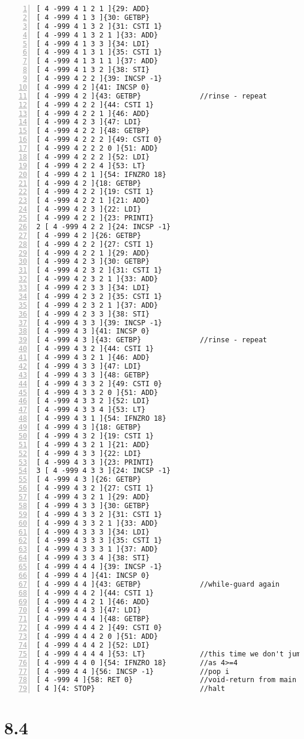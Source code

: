 \documentclass[a4paper, titlepage]{article}
\begin{document}
\begin{lstlisting}[numbers=left, title=ex.3.c.trace]
[ 4 -999 4 1 2 1 ]{29: ADD}
[ 4 -999 4 1 3 ]{30: GETBP}
[ 4 -999 4 1 3 2 ]{31: CSTI 1}
[ 4 -999 4 1 3 2 1 ]{33: ADD}
[ 4 -999 4 1 3 3 ]{34: LDI}
[ 4 -999 4 1 3 1 ]{35: CSTI 1}
[ 4 -999 4 1 3 1 1 ]{37: ADD}
[ 4 -999 4 1 3 2 ]{38: STI}
[ 4 -999 4 2 2 ]{39: INCSP -1}
[ 4 -999 4 2 ]{41: INCSP 0}
[ 4 -999 4 2 ]{43: GETBP}              //rinse - repeat
[ 4 -999 4 2 2 ]{44: CSTI 1}
[ 4 -999 4 2 2 1 ]{46: ADD}
[ 4 -999 4 2 3 ]{47: LDI}
[ 4 -999 4 2 2 ]{48: GETBP}
[ 4 -999 4 2 2 2 ]{49: CSTI 0}
[ 4 -999 4 2 2 2 0 ]{51: ADD}
[ 4 -999 4 2 2 2 ]{52: LDI}
[ 4 -999 4 2 2 4 ]{53: LT}
[ 4 -999 4 2 1 ]{54: IFNZRO 18}
[ 4 -999 4 2 ]{18: GETBP}
[ 4 -999 4 2 2 ]{19: CSTI 1}
[ 4 -999 4 2 2 1 ]{21: ADD}
[ 4 -999 4 2 3 ]{22: LDI}
[ 4 -999 4 2 2 ]{23: PRINTI}
2 [ 4 -999 4 2 2 ]{24: INCSP -1}
[ 4 -999 4 2 ]{26: GETBP}
[ 4 -999 4 2 2 ]{27: CSTI 1}
[ 4 -999 4 2 2 1 ]{29: ADD}
[ 4 -999 4 2 3 ]{30: GETBP}
[ 4 -999 4 2 3 2 ]{31: CSTI 1}
[ 4 -999 4 2 3 2 1 ]{33: ADD}
[ 4 -999 4 2 3 3 ]{34: LDI}
[ 4 -999 4 2 3 2 ]{35: CSTI 1}
[ 4 -999 4 2 3 2 1 ]{37: ADD}
[ 4 -999 4 2 3 3 ]{38: STI}
[ 4 -999 4 3 3 ]{39: INCSP -1}
[ 4 -999 4 3 ]{41: INCSP 0}
[ 4 -999 4 3 ]{43: GETBP}              //rinse - repeat
[ 4 -999 4 3 2 ]{44: CSTI 1}
[ 4 -999 4 3 2 1 ]{46: ADD}
[ 4 -999 4 3 3 ]{47: LDI}
[ 4 -999 4 3 3 ]{48: GETBP}
[ 4 -999 4 3 3 2 ]{49: CSTI 0}
[ 4 -999 4 3 3 2 0 ]{51: ADD}
[ 4 -999 4 3 3 2 ]{52: LDI}
[ 4 -999 4 3 3 4 ]{53: LT}
[ 4 -999 4 3 1 ]{54: IFNZRO 18}
[ 4 -999 4 3 ]{18: GETBP}
[ 4 -999 4 3 2 ]{19: CSTI 1}
[ 4 -999 4 3 2 1 ]{21: ADD}
[ 4 -999 4 3 3 ]{22: LDI}
[ 4 -999 4 3 3 ]{23: PRINTI}
3 [ 4 -999 4 3 3 ]{24: INCSP -1}
[ 4 -999 4 3 ]{26: GETBP}
[ 4 -999 4 3 2 ]{27: CSTI 1}
[ 4 -999 4 3 2 1 ]{29: ADD}
[ 4 -999 4 3 3 ]{30: GETBP}
[ 4 -999 4 3 3 2 ]{31: CSTI 1}
[ 4 -999 4 3 3 2 1 ]{33: ADD}
[ 4 -999 4 3 3 3 ]{34: LDI}
[ 4 -999 4 3 3 3 ]{35: CSTI 1}
[ 4 -999 4 3 3 3 1 ]{37: ADD}
[ 4 -999 4 3 3 4 ]{38: STI}
[ 4 -999 4 4 4 ]{39: INCSP -1}
[ 4 -999 4 4 ]{41: INCSP 0}
[ 4 -999 4 4 ]{43: GETBP}              //while-guard again
[ 4 -999 4 4 2 ]{44: CSTI 1}
[ 4 -999 4 4 2 1 ]{46: ADD}
[ 4 -999 4 4 3 ]{47: LDI}
[ 4 -999 4 4 4 ]{48: GETBP}
[ 4 -999 4 4 4 2 ]{49: CSTI 0}
[ 4 -999 4 4 4 2 0 ]{51: ADD}
[ 4 -999 4 4 4 2 ]{52: LDI}
[ 4 -999 4 4 4 4 ]{53: LT}             //this time we don't jump though
[ 4 -999 4 4 0 ]{54: IFNZRO 18}        //as 4>=4
[ 4 -999 4 4 ]{56: INCSP -1}           //pop i
[ 4 -999 4 ]{58: RET 0}                //void-return from main
[ 4 ]{4: STOP}                         //halt
\end{lstlisting}

\section*{8.4}
\end{document}
